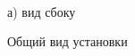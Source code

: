 \documentclass[a4paper,12pt]{article}
\theoremstyle{plain} %
\theoremstyle{definition} %
\theoremstyle{remark} %
\begin{document}
\begin{figure}
	\noindent{}
	\caption{Общий вид установки}
	\label{ust}
	\vspace{0.5cm}
	\begin{minipage}[h]{0.45\linewidth}
		 \\а) вид сбоку
	\end{minipage}
	\hfill
	\begin{minipage}[h]{0.45\linewidth}

\end{minipage}
\end{figure}
\end{document}

